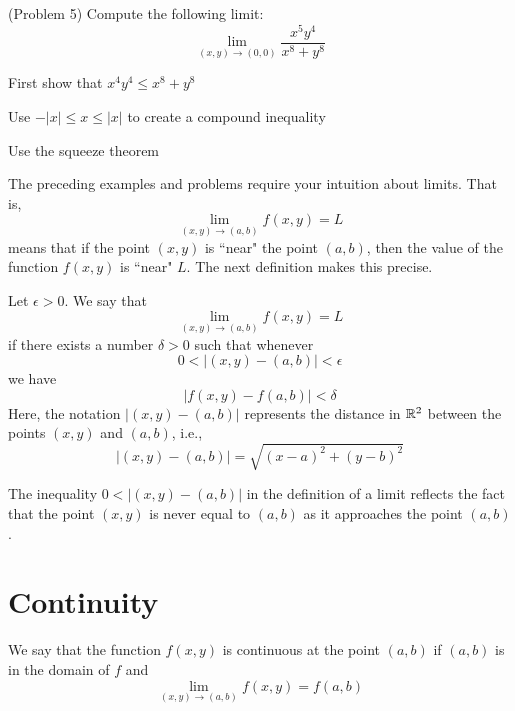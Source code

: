 \documentclass[handout]{ximera}
\begin{document}
\begin{problem}(Problem 5)
Compute the following limit:
\[
\lim_{(x,y) \to (0,0)} \frac{x^5y^4}{x^8 + y^8}
\]
\begin{hint}
First show that $x^4y^4 \leq x^8 + y^8$
\end{hint}
\begin{hint}
Use $-|x| \leq x \leq |x|$ to create a compound inequality
\end{hint}
\begin{hint}
Use the squeeze theorem
\end{hint}
\end{problem}
The preceding examples and problems require your intuition about limits.  That is,
\[
\lim_{(x,y) \to (a,b)} f(x,y) = L
\]
means that if the point $(x,y)$ is ``near" the point $(a,b)$, then the value of the function $f(x, y)$ is ``near" $L$.
The next definition makes this precise.


\begin{definition}[Limit]
Let $\epsilon > 0$. We say that
\[
\lim_{(x,y) \to (a,b)} f(x,y) = L
\]
if there exists a number $\delta >0$ such that whenever
\[
0< \left|(x,y) - (a,b)\right| < \epsilon
\]
we have
\[
\left|f(x,y) - f(a,b)\right| < \delta
\]
Here, the notation $|(x,y) - (a,b)|$ represents the distance in $\mathbb R^2$ between the points $(x,y)$ and $(a,b)$, i.e.,
\[
|(x,y) - (a,b)| = \sqrt{(x-a)^2 + (y-b)^2}
\]
\end{definition}

\begin{remark}
The inequality $0< |(x,y) - (a,b)|$ in the definition of a limit reflects the fact that the point $(x,y)$ is never equal to $(a,b)$
as it approaches the point $(a,b)$.
\end{remark}

\section{Continuity}

\begin{definition}[Continuity]
We say that the function $f(x,y)$ is continuous at the point $(a,b)$ if $(a,b)$ is in the domain of $f$ and 
\[
\lim_{(x,y) \to (a,b)} f(x,y) = f(a,b)
\]
\end{definition}
\end{document}
